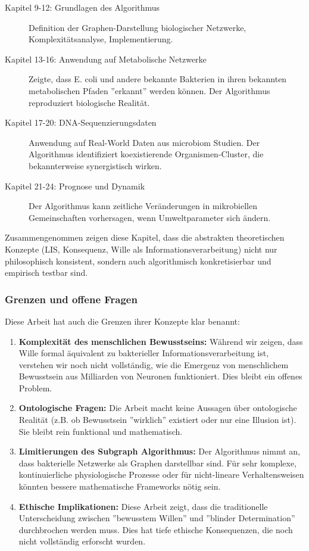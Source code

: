 \documentclass[a4paper,12pt]{article}
\theoremstyle{definition}
\begin{document}
\begin{description}
    \item[Kapitel 9-12: Grundlagen des Algorithmus] Definition der Graphen-Darstellung biologischer Netzwerke, Komplexitätsanalyse, Implementierung.
    
    \item[Kapitel 13-16: Anwendung auf Metabolische Netzwerke] Zeigte, dass E. coli und andere bekannte Bakterien in ihren bekannten metabolischen Pfaden ''erkannt'' werden können. Der Algorithmus reproduziert biologische Realität.
    
    \item[Kapitel 17-20: DNA-Sequenzierungsdaten] Anwendung auf Real-World Daten aus microbiom Studien. Der Algorithmus identifiziert koexistierende Organismen-Cluster, die bekannterweise synergistisch wirken.
    
    \item[Kapitel 21-24: Prognose und Dynamik] Der Algorithmus kann zeitliche Veränderungen in mikrobiellen Gemeinschaften vorhersagen, wenn Umweltparameter sich ändern.
\end{description}

Zusammengenommen zeigen diese Kapitel, dass die abstrakten theoretischen Konzepte (LIS, Konsequenz, Wille als Informationsverarbeitung) nicht nur philosophisch konsistent, sondern auch algorithmisch konkretisierbar und empirisch testbar sind.

\subsubsection{Grenzen und offene Fragen}

Diese Arbeit hat auch die Grenzen ihrer Konzepte klar benannt:

\begin{enumerate}
    \item \textbf{Komplexität des menschlichen Bewusstseins:} Während wir zeigen, dass Wille formal äquivalent zu bakterieller Informationsverarbeitung ist, verstehen wir noch nicht vollständig, wie die Emergenz von menschlichem Bewusstsein aus Milliarden von Neuronen funktioniert. Dies bleibt ein offenes Problem.
    
    \item \textbf{Ontologische Fragen:} Die Arbeit macht keine Aussagen über ontologische Realität (z.B. ob Bewusstsein ''wirklich'' existiert oder nur eine Illusion ist). Sie bleibt rein funktional und mathematisch.
    
    \item \textbf{Limitierungen des Subgraph Algorithmus:} Der Algorithmus nimmt an, dass bakterielle Netzwerke als Graphen darstellbar sind. Für sehr komplexe, kontinuierliche physiologische Prozesse oder für nicht-lineare Verhaltensweisen könnten bessere mathematische Frameworks nötig sein.
    
    \item \textbf{Ethische Implikationen:} Diese Arbeit zeigt, dass die traditionelle Unterscheidung zwischen ''bewusstem Willen'' und ''blinder Determination'' durchbrochen werden muss. Dies hat tiefe ethische Konsequenzen, die noch nicht vollständig erforscht wurden.
\end{enumerate}
\end{document}
